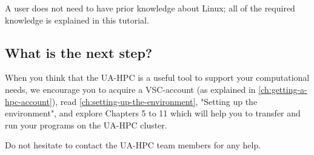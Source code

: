 A user does not need to have prior knowledge about Linux; all of the required
knowledge is explained in this tutorial.

\subsection{What is the next step?}
\label{subsec:what-is-the-next-step}

When you think that the UA-HPC is a useful tool to support your computational
needs, we encourage you to acquire a VSC-account (as explained in
\autoref{ch:getting-a-hpc-account}), read \autoref{ch:setting-up-the-environment}, "Setting up the
environment", and explore Chapters 5 to 11 which will help you to transfer and
run your programs on the UA-HPC cluster.

Do not hesitate to contact the UA-HPC team members for any help.
